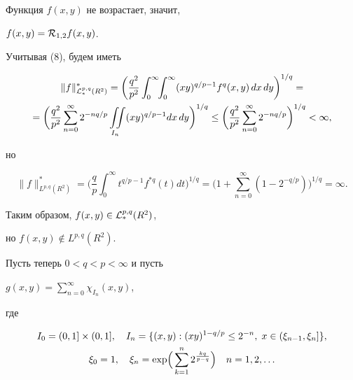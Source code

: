 Функция $f(x,y)$ не возрастает, значит,


$f(x,y) = {\cal R}_{1,2}f(x,y)$.


Учитывая (8), будем иметь


\begin{multline*}


\|f\|_{{\cal L}_*^{p,q}(R^2)}^* =


\biggl(\frac{q^2}{p^2} \int_0^{\infty} \!\! \int_0^{\infty}


(xy)^{q/p-1} f^q(x,y)\,dx\,dy \biggr)^{1/q}= \\


%


=\biggl(\frac{q^2}{p^2} \sum_{n=0}^{\infty} 2^{-nq/p}


\iint\limits_{I_n}


(xy)^{q/p-1}dx\,dy \biggr)^{1/q}  \le


\biggl(\frac{q^2}{p^2}\sum_{n=0}^{\infty}


2^{-nq/p} \biggr)^{1/q} < \infty,


\end{multline*}


но


$$


\|f\|_{L^{p,q}(R^2)}^* =


\biggl(\frac{q}{p} \int_0^{\infty} t^{q/p-1}


f^{*q}(t)dt \biggr)^{1/q} =


\biggl(1+ \sum_{n=0}^{\infty}


(1-2^{-q/p})\biggr)^{1/q} = \infty.


$$


Таким образом, $f(x,y) \in {\cal L}_*^{p,q}(R^2)$,


но $f(x,y) \notin L^{p,q}(R^2)$.





Пусть теперь $0<q<p<\infty$ и пусть


$g(x,y) = \sum\limits_{n=0}^{\infty} \chi_{I_n}(x,y)$,


где


\begin{gather}


I_0 = (0,1] \times (0,1],\quad


I_n=\{(x,y): (xy)^{1-q/p} \le 2^{-n}, \;


x \in (\xi_{n-1},\xi_n] \}, \\


%


\xi_0 = 1, \quad \xi_n = \exp \Bigl(\,\sum_{k=1}^{n} 2^{\frac{kq}{p-q}}


\Bigr) \quad n=1,2,\dotsc \notag


\end{gather}


